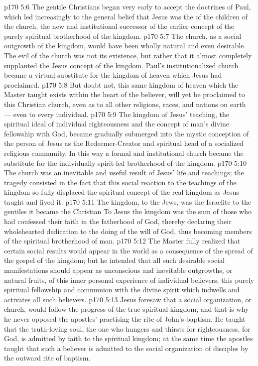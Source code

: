 \vs p170 5:6 \bibnobreakspace The gentile Christians began very early to accept the doctrines of Paul, which led increasingly to the general belief that Jesus was the  of the children of the church, the new and institutional successor of the earlier concept of the purely spiritual brotherhood of the kingdom.
\vs p170 5:7 \pc The church, as a social outgrowth of the kingdom, would have been wholly natural and even desirable. The evil of the church was not its existence, but rather that it almost completely supplanted the Jesus concept of the kingdom. Paul’s institutionalized church became a virtual substitute for the kingdom of heaven which Jesus had proclaimed.
\vs p170 5:8 But doubt not, this same kingdom of heaven which the Master taught exists within the heart of the believer, will yet be proclaimed to this Christian church, even as to all other religions, races, and nations on earth --- even to every individual.
\vs p170 5:9 The kingdom of Jesus’ teaching, the spiritual ideal of individual righteousness and the concept of man’s divine fellowship with God, became gradually submerged into the mystic conception of the person of Jesus as the Redeemer\hyp{}Creator and spiritual head of a socialized religious community. In this way a formal and institutional church became the substitute for the individually spirit\hyp{}led brotherhood of the kingdom.
\vs p170 5:10 The church was an inevitable and useful  result of Jesus’ life and teachings; the tragedy consisted in the fact that this social reaction to the teachings of the kingdom so fully displaced the spiritual concept of the real kingdom as Jesus taught and lived it.
\vs p170 5:11 The kingdom, to the Jews, was the Israelite  to the gentiles it became the Christian  To Jesus the kingdom was the sum of those  who had confessed their faith in the fatherhood of God, thereby declaring their wholehearted dedication to the doing of the will of God, thus becoming members of the spiritual brotherhood of man.
\vs p170 5:12 The Master fully realized that certain social results would appear in the world as a consequence of the spread of the gospel of the kingdom; but he intended that all such desirable social manifestations should appear as unconscious and inevitable outgrowths, or natural fruits, of this inner personal experience of individual believers, this purely spiritual fellowship and communion with the divine spirit which indwells and activates all such believers.
\vs p170 5:13 Jesus foresaw that a social organization, or church, would follow the progress of the true spiritual kingdom, and that is why he never opposed the apostles’ practising the rite of John’s baptism. He taught that the truth\hyp{}loving soul, the one who hungers and thirsts for righteousness, for God, is admitted by faith to the spiritual kingdom; at the same time the apostles taught that such a believer is admitted to the social organization of disciples by the outward rite of baptism.
